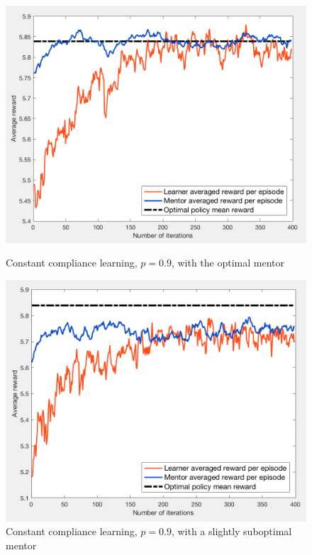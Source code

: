 \documentclass[a4paper]{report}
\begin{document}
{{{			\begin{figure}[ht!]
				\begin{minipage}{0.5\linewidth}
					\begin{center}
						\includegraphics[width=0.9\linewidth]{very_naive_opt}
						\caption{Constant compliance learning, $p=0.9$, with the optimal mentor}
						\label{fig::comp_opt_verynaive}
					\end{center}
				\end{minipage}
				\begin{minipage}{0.5\linewidth}
					\begin{center}
						\includegraphics[width=0.9\linewidth]{very_naive_200}
						\caption{Constant compliance learning, $p=0.9$, with a slightly suboptimal mentor}
						\label{fig::comp_subopt220_verynaive}
					\end{center}
				\end{minipage}
			\end{figure}
	
}}}
\end{document}
